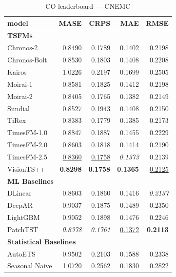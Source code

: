 \begin{table}[H]
\caption{CO leaderboard --- CNEMC}
\centering
\begin{small}
\begin{tabular}{lrrrr}
\toprule
model & MASE & CRPS & MAE & RMSE \\
\midrule
\multicolumn{5}{l}{\textbf{TSFMs}} \\
Chronos-2 & 0.8490 & 0.1789 & 0.1402 & 0.2198 \\
Chronos-Bolt & 0.8530 & 0.1803 & 0.1408 & 0.2208 \\
Kairos & 1.0226 & 0.2197 & 0.1699 & 0.2505 \\
Moirai-1 & 0.8581 & 0.1825 & 0.1412 & 0.2198 \\
Moirai-2 & 0.8405 & 0.1765 & 0.1382 & 0.2149 \\
Sundial & 0.8527 & 0.1943 & 0.1408 & 0.2150 \\
TiRex & 0.8383 & 0.1779 & 0.1385 & 0.2173 \\
TimesFM-1.0 & 0.8847 & 0.1887 & 0.1455 & 0.2229 \\
TimesFM-2.0 & 0.8603 & 0.1818 & 0.1414 & 0.2190 \\
TimesFM-2.5 & \underline{0.8360} & \underline{0.1758} & \textit{0.1373} & 0.2139 \\
VisionTS++ & \textbf{0.8298} & \textbf{0.1758} & \textbf{0.1365} & \underline{0.2125} \\
\midrule
\multicolumn{5}{l}{\textbf{ML Baselines}} \\
DLinear & 0.8603 & 0.1860 & 0.1416 & \textit{0.2137} \\
DeepAR & 0.9037 & 0.1875 & 0.1489 & 0.2350 \\
LightGBM & 0.9052 & 0.1898 & 0.1476 & 0.2246 \\
PatchTST & \textit{0.8378} & \textit{0.1761} & \underline{0.1372} & \textbf{0.2113} \\
\midrule
\multicolumn{5}{l}{\textbf{Statistical Baselines}} \\
AutoETS & 0.9502 & 0.2103 & 0.1588 & 0.2338 \\
Seasonal Naive & 1.0720 & 0.2562 & 0.1830 & 0.2822 \\
\bottomrule
\end{tabular}
\end{small}
\end{table}